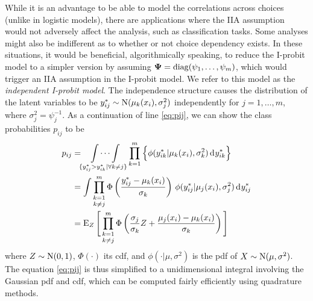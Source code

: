 While it is an advantage to be able to model the correlations across choices (unlike in logistic models), there are applications where the IIA assumption would not adversely affect the analysis, such as classification tasks.
Some analyses might also be indifferent as to whether or not choice dependency exists.
In these situations, it would be beneficial, algorithmically speaking, to reduce the I-probit model to a simpler version by assuming ${\bm\Psi} = \operatorname{diag}(\psi_1,\dots,\psi_m)$, which would trigger an IIA assumption in the I-probit model.
We refer to this model as the \emph{independent I-probit model}.
The independence structure causes the distribution of the latent variables to be $y_{ij}^* \sim \operatorname{N}(\mu_k(x_i), \sigma_j^2)$ independently for $j=1,\dots,m$, where $\sigma_j^2 = \psi_j^{-1}$.
As a continuation of line \cref{eq:pij}, we can show the class probabilities $p_{ij}$ to be
\vspace{-0.5em}
\begin{align}
  p_{ij} 
  &= \idotsint\displaylimits_{\{y_{ij}^* > y_{ik}^* | \forall k \neq j\}} 
  \prod_{k=1}^m \Big\{ \phi(y_{ik}^*|\mu_k(x_i), \sigma_k^2) \operatorname{d}\hspace{0.5pt}\! y_{ik}^* \Big\} \nonumber \\
  &= \int \mathop{\prod_{k=1}^m}_{k\neq j} 
  \Phi \left( \frac{y_{ij}^* - \mu_k(x_i)}{\sigma_k} \right) \,
   \phi(y_{ij}^*|\mu_j(x_i), \sigma_j^2)  \operatorname{d}\hspace{0.5pt}\! y_{ij}^* \nonumber \\
  &= \operatorname{E}_Z \Bigg[ \mathop{\prod_{k=1}^m}_{k\neq j} 
  \Phi \left(\frac{\sigma_j}{\sigma_k} Z + \frac{\mu_j(x_i) - \mu_k(x_i)}{\sigma_k} \right) \Bigg] \label{eq:pij2}
\end{align}
where $Z\sim\operatorname{N}(0,1)$, $\Phi(\cdot)$ its cdf, and $\phi(\cdot|\mu,\sigma^2)$ is the pdf of $X\sim\operatorname{N}(\mu,\sigma^2)$.
The equation \cref{eq:pij} is thus simplified to a unidimensional integral involving the Gaussian pdf and cdf, which can be computed fairly efficiently using quadrature methods.
